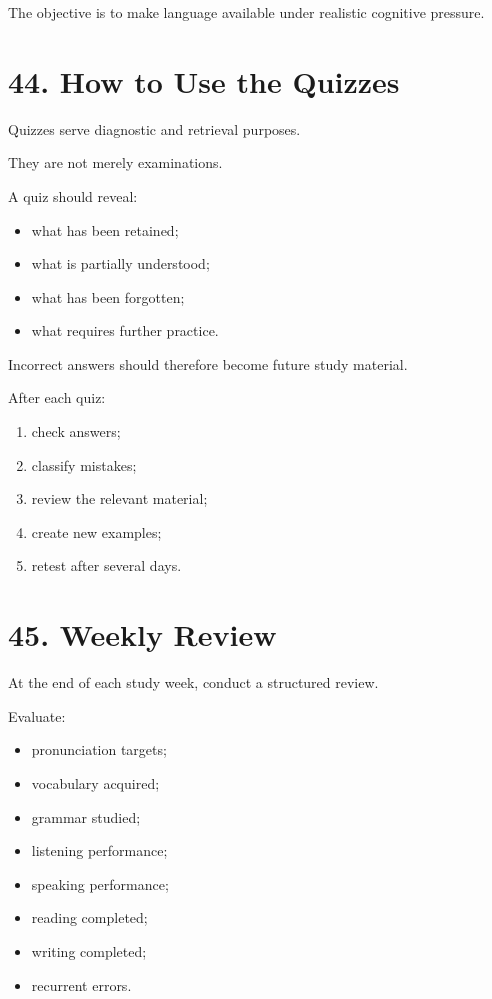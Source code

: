 The objective is to make language available under realistic cognitive pressure.

\section*{44. How to Use the Quizzes}

Quizzes serve diagnostic and retrieval purposes.

They are not merely examinations.

A quiz should reveal:

\begin{itemize}
    \item what has been retained;
    \item what is partially understood;
    \item what has been forgotten;
    \item what requires further practice.
\end{itemize}

Incorrect answers should therefore become future study material.

After each quiz:

\begin{enumerate}
    \item check answers;
    \item classify mistakes;
    \item review the relevant material;
    \item create new examples;
    \item retest after several days.
\end{enumerate}

\section*{45. Weekly Review}

At the end of each study week, conduct a structured review.

Evaluate:

\begin{itemize}
    \item pronunciation targets;
    \item vocabulary acquired;
    \item grammar studied;
    \item listening performance;
    \item speaking performance;
    \item reading completed;
    \item writing completed;
    \item recurrent errors.
\end{itemize}


